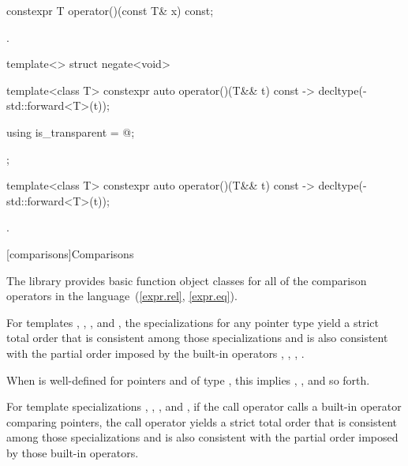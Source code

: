 %
\begin{itemdecl}
constexpr T operator()(const T& x) const;
\end{itemdecl}

\begin{itemdescr}
\pnum\returns {}.
\end{itemdescr}

%
\begin{itemdecl}
template<> struct negate<void> {
  template<class T> constexpr auto operator()(T&& t) const
    -> decltype(-std::forward<T>(t));

  using is_transparent = @\unspec@;
};
\end{itemdecl}

%
\begin{itemdecl}
template<class T> constexpr auto operator()(T&& t) const
    -> decltype(-std::forward<T>(t));
\end{itemdecl}

\begin{itemdescr}
\pnum\returns {}.
\end{itemdescr}


[comparisons]{Comparisons}

\pnum
The library provides basic function object classes for all of the comparison
operators in the language~(\ref{expr.rel}, \ref{expr.eq}).

\pnum
For templates , , , and
, the specializations for any pointer type
yield a strict total order that is consistent among those specializations and
is also consistent with the partial order imposed by
the built-in operators \tcode{<}, \tcode{>}, \tcode{<=}, \tcode{>=}.
\begin{note} When  is well-defined
for pointers  and  of type ,
this implies ,
, and so forth. \end{note}
For template specializations , ,
, and ,
if the call operator calls a built-in operator comparing pointers,
the call operator yields a strict total order
that is consistent among those specializations and
is also consistent with the partial order imposed by those built-in operators.

